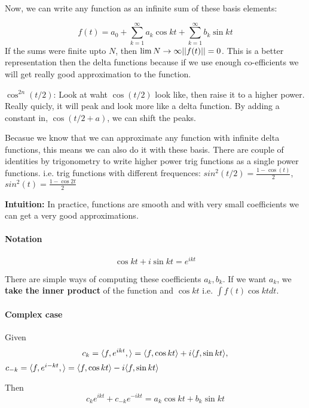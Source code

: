 Now, we can write any function as an infinite sum of these basis
elements:

\begin{equation}
  \label{eq:2}
  f(t) = a_0 + \sum_{k=1}^\infty a_k \cos kt + \sum_{k=1}^\infty b_k
  \sin kt
\end{equation}
If the sums were finite upto $N$, then $\lim{N\rightarrow\infty} ||f(t)|| =
0$. This is a better representation then the delta functions because
if we use enough co-efficients we will get really good approximation
to the function.

$\cos^{2n}(t/2)$: Look at waht $\cos(t/2)$ look like, then raise it to
a higher power. Really quicly, it will peak and look more like a delta
function. By adding a constant in, $\cos(t/2 + a)$, we can shift the
peaks. 

Becasue we know that we can approximate any function with infinite
delta functions, this means we can also do it with these basis. 
There are couple of identities by trigonometry to write higher power
trig functions as a single power functions. i.e. trig functions with
different frequences: 
$sin^2(t/2) = \frac{1-\cos(t)}{2}$, $sin^2(t) = \frac{1-\cos 2t}{2}$

\textbf{Intuition:} In practice, functions are smooth and with very
small coefficients we can get a very good approximations.

\paragraph{Notation}
\begin{equation}
  \label{eq:3}
  \cos kt + i \sin kt = e^{i k t}
\end{equation}

There are simple ways of computing these coefficients $a_k, b_k$. If
we want $a_k$, we \textbf{take the inner product }of the function and $\cos kt$
i.e. $\int f(t) \cos kt dt$.

\paragraph{Complex case}
Given $$c_k = \langle f, e^{ikt}, \rangle = \langle f, \cos kt \rangle + i\langle f, \sin
kt \rangle,$$ $c_{-k} = \langle f, e^{i-kt}, \rangle = \langle f, \cos kt \rangle - i\langle f, \sin kt\rangle$

Then
\begin{equation}
c_ke^{ikt} + c_{-k}e^{-ikt} = a_k \cos kt + b_k \sin kt\label{eq:5}
\end{equation}

